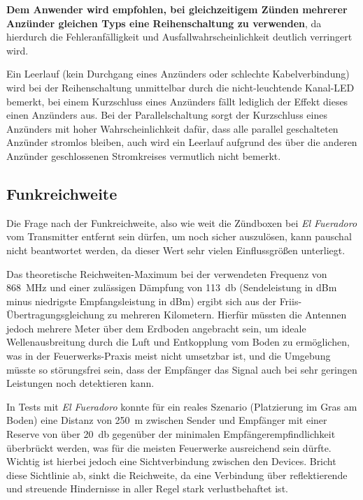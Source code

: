 \documentclass[paper=a4, parskip, numbers=noenddot, toc=listof, headsepline]{scrbook}
\newcommand{\anlage}{\emph{El Fueradoro}}
\begin{document}
					\textbf{Dem Anwender wird empfohlen, bei gleichzeitigem Zünden mehrerer Anzünder gleichen Typs eine Reihenschaltung zu verwenden}, da hierdurch die Fehleranfälligkeit und Ausfallwahrscheinlichkeit deutlich verringert wird.

					Ein Leerlauf (kein Durchgang eines Anzünders oder schlechte Kabelverbindung) wird bei der Reihenschaltung unmittelbar durch die nicht-leuchtende Kanal-LED bemerkt, bei einem Kurzschluss eines Anzünders fällt lediglich der Effekt dieses einen Anzünders aus. Bei der Parallelschaltung sorgt der Kurzschluss eines Anzünders mit hoher Wahrscheinlichkeit dafür, dass alle parallel geschalteten Anzünder stromlos bleiben, auch wird ein Leerlauf aufgrund des über die anderen Anzünder geschlossenen Stromkreises vermutlich nicht bemerkt.

				\subsection{Funkreichweite}

					Die Frage nach der Funkreichweite, also wie weit die Zündboxen bei {\anlage} vom Transmitter entfernt sein dürfen, um noch sicher auszulösen, kann pauschal nicht beantwortet werden, da dieser Wert sehr vielen Einflussgrößen unterliegt.

					Das theoretische Reichweiten-Maximum bei der verwendeten Frequenz von \SI{868}{\mega\hertz} und einer zulässigen Dämpfung von \SI{113}{\decibel} (Sendeleistung in dBm minus niedrigste Empfangsleistung in dBm) ergibt sich aus der Friis-Übertragungsgleichung zu mehreren Kilometern. Hierfür müssten die Antennen jedoch mehrere Meter über dem Erdboden angebracht sein, um ideale Wellenausbreitung durch die Luft und Entkopplung vom Boden zu ermöglichen, was in der Feuerwerks-Praxis meist nicht umsetzbar ist, und die Umgebung müsste so störungsfrei sein, dass der Empfänger das Signal auch bei sehr geringen Leistungen noch detektieren kann.

					In Tests mit {\anlage} konnte für ein reales Szenario (Platzierung im Gras am Boden) eine Distanz von \SI{250}{\meter} zwischen Sender und Empfänger mit einer Reserve von über \SI{20}{\decibel} gegenüber der minimalen Empfänger\-empfindlichkeit überbrückt werden, was für die meisten Feuerwerke ausreichend sein dürfte. Wichtig ist hierbei jedoch eine Sichtverbindung zwischen den Devices. Bricht diese Sichtlinie ab, sinkt die Reichweite, da eine Verbindung über reflektierende und streuende Hindernisse in aller Regel stark verlustbehaftet ist.
\end{document}
